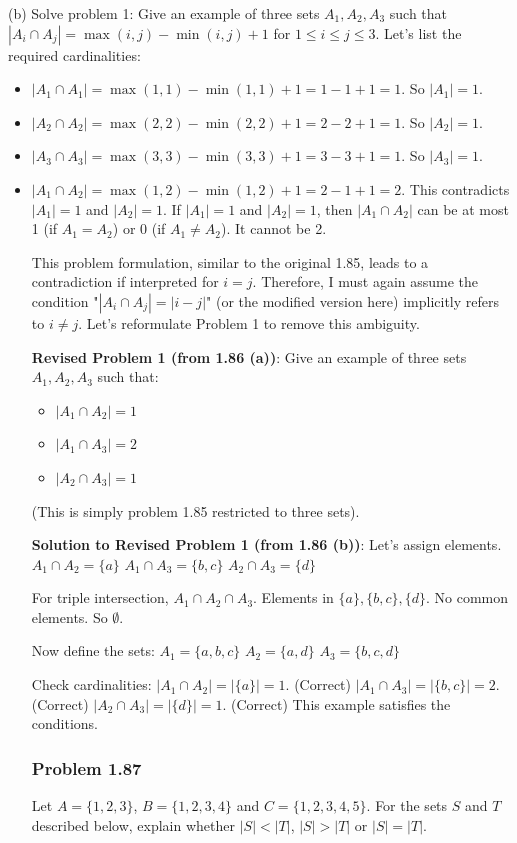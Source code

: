 \documentclass{article}
\begin{document}
\begin{itemize}
(b) Solve problem 1: Give an example of three sets $A_1, A_2, A_3$ such that $|A_i \cap A_j| = \max(i, j) - \min(i, j) + 1$ for $1 \le i \le j \le 3$.
Let's list the required cardinalities:
\begin{itemize}
    \item $|A_1 \cap A_1| = \max(1,1) - \min(1,1) + 1 = 1-1+1 = 1$. So $|A_1|=1$.
    \item $|A_2 \cap A_2| = \max(2,2) - \min(2,2) + 1 = 2-2+1 = 1$. So $|A_2|=1$.
    \item $|A_3 \cap A_3| = \max(3,3) - \min(3,3) + 1 = 3-3+1 = 1$. So $|A_3|=1$.
    \item $|A_1 \cap A_2| = \max(1,2) - \min(1,2) + 1 = 2-1+1 = 2$. This contradicts $|A_1|=1$ and $|A_2|=1$. If $|A_1|=1$ and $|A_2|=1$, then $|A_1 \cap A_2|$ can be at most 1 (if $A_1=A_2$) or 0 (if $A_1 \ne A_2$). It cannot be 2.

This problem formulation, similar to the original 1.85, leads to a contradiction if interpreted for $i=j$.
Therefore, I must again assume the condition "$|A_i \cap A_j| = |i-j|$" (or the modified version here) implicitly refers to $i \ne j$.
Let's reformulate Problem 1 to remove this ambiguity.

\textbf{Revised Problem 1 (from 1.86 (a))}:
Give an example of three sets $A_1, A_2, A_3$ such that:
\begin{itemize}
    \item $|A_1 \cap A_2| = 1$
    \item $|A_1 \cap A_3| = 2$
    \item $|A_2 \cap A_3| = 1$
\end{itemize}
(This is simply problem 1.85 restricted to three sets).

\textbf{Solution to Revised Problem 1 (from 1.86 (b))}:
Let's assign elements.
$A_1 \cap A_2 = \{a\}$
$A_1 \cap A_3 = \{b, c\}$
$A_2 \cap A_3 = \{d\}$

For triple intersection, $A_1 \cap A_2 \cap A_3$.
Elements in $\{a\}, \{b, c\}, \{d\}$. No common elements. So $\emptyset$.

Now define the sets:
$A_1 = \{a, b, c\}$
$A_2 = \{a, d\}$
$A_3 = \{b, c, d\}$

Check cardinalities:
$|A_1 \cap A_2| = |\{a\}| = 1$. (Correct)
$|A_1 \cap A_3| = |\{b, c\}| = 2$. (Correct)
$|A_2 \cap A_3| = |\{d\}| = 1$. (Correct)
This example satisfies the conditions.

\subsubsection*{Problem 1.87}
Let $A = \{1, 2, 3\}$, $B = \{1, 2, 3, 4\}$ and $C = \{1, 2, 3, 4, 5\}$. For the sets $S$ and $T$ described below, explain whether $|S| < |T|$, $|S| > |T|$ or $|S| = |T|$.


\end{itemize}
\end{itemize}
\end{document}
